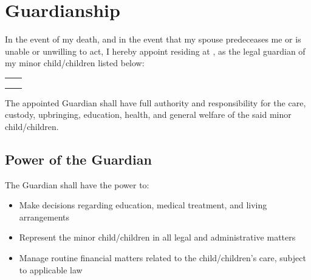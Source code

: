 
\section{Guardianship}
\label{sec:guardianship}

In the event of my death, and in the event that my spouse \SpouseInfo{} predeceases me or is unable or unwilling to act, I hereby appoint \GuardianName{} residing at \GuardianAddress{}, as the legal guardian of my minor child/children listed below:

\vspace{0.5 cm}

\noindent
\begin{tabular}{p{8cm} p{8cm}}
\textbf{\FirstChildName{}} & \FirstChildBirthday{} \\ 
\textbf{\SecondChildName{}} & \SecondChildBirthday{} \\ 
\textbf{\ThirdChildName{}} & \ThirdChildBirthday{} \\ 
\end{tabular}

\vspace{0.5 cm}

\noindent The appointed Guardian shall have full authority and responsibility for the care, custody, upbringing, education, health, and general welfare of the said minor child/children.

\subsection*{Power of the Guardian}
The Guardian shall have the power to:

\begin{itemize}
  \item Make decisions regarding education, medical treatment, and living arrangements
  \item Represent the minor child/children in all legal and administrative matters
  \item Manage routine financial matters related to the child/children’s care, subject to applicable law
\end{itemize}

